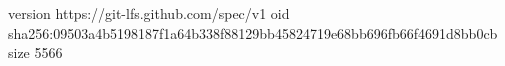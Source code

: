 version https://git-lfs.github.com/spec/v1
oid sha256:09503a4b5198187f1a64b338f88129bb45824719e68bb696fb66f4691d8bb0cb
size 5566
